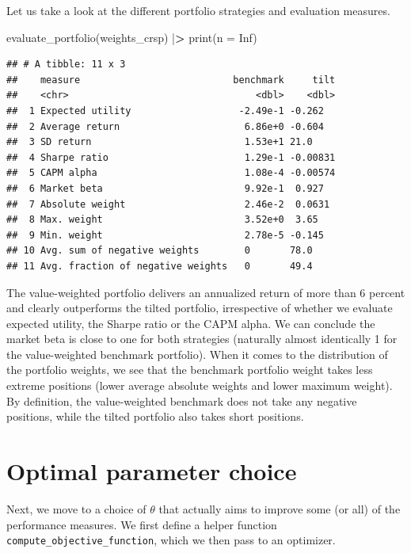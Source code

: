 \documentclass[
]{krantz}
\newenvironment{Shaded}{\begin{snugshade}}{\end{snugshade}}
\newcommand{\AttributeTok}[1]{\textcolor[rgb]{0.61,0.61,0.61}{#1}}
\newcommand{\ConstantTok}[1]{\textcolor[rgb]{0,0,0}{#1}}
\newcommand{\ErrorTok}[1]{\textcolor[rgb]{0.14,0.14,0.14}{\textbf{#1}}}
\newcommand{\FunctionTok}[1]{\textcolor[rgb]{0,0,0}{#1}}
\newcommand{\NormalTok}[1]{#1}
\newcommand{\SpecialCharTok}[1]{\textcolor[rgb]{0,0,0}{#1}}
\begin{document}
Let us take a look at the different portfolio strategies and evaluation measures.

\begin{Shaded}
\begin{Highlighting}[]
\FunctionTok{evaluate\_portfolio}\NormalTok{(weights\_crsp) }\SpecialCharTok{|}\ErrorTok{\textgreater{}} \FunctionTok{print}\NormalTok{(}\AttributeTok{n =} \ConstantTok{Inf}\NormalTok{)}
\end{Highlighting}
\end{Shaded}

\begin{verbatim}
## # A tibble: 11 x 3
##    measure                           benchmark     tilt
##    <chr>                                 <dbl>    <dbl>
##  1 Expected utility                   -2.49e-1 -0.262  
##  2 Average return                      6.86e+0 -0.604  
##  3 SD return                           1.53e+1 21.0    
##  4 Sharpe ratio                        1.29e-1 -0.00831
##  5 CAPM alpha                          1.08e-4 -0.00574
##  6 Market beta                         9.92e-1  0.927  
##  7 Absolute weight                     2.46e-2  0.0631 
##  8 Max. weight                         3.52e+0  3.65   
##  9 Min. weight                         2.78e-5 -0.145  
## 10 Avg. sum of negative weights        0       78.0    
## 11 Avg. fraction of negative weights   0       49.4
\end{verbatim}

The value-weighted portfolio delivers an annualized return of more than 6 percent and clearly outperforms the tilted portfolio, irrespective of whether we evaluate expected utility, the Sharpe ratio or the CAPM alpha. We can conclude the market beta is close to one for both strategies (naturally almost identically 1 for the value-weighted benchmark portfolio). When it comes to the distribution of the portfolio weights, we see that the benchmark portfolio weight takes less extreme positions (lower average absolute weights and lower maximum weight). By definition, the value-weighted benchmark does not take any negative positions, while the tilted portfolio also takes short positions.

\hypertarget{optimal-parameter-choice}{%
\section{Optimal parameter choice}\label{optimal-parameter-choice}}

Next, we move to a choice of \(\theta\) that actually aims to improve some (or all) of the performance measures. We first define a helper function \texttt{compute\_objective\_function}, which we then pass to an optimizer.
\end{document}
